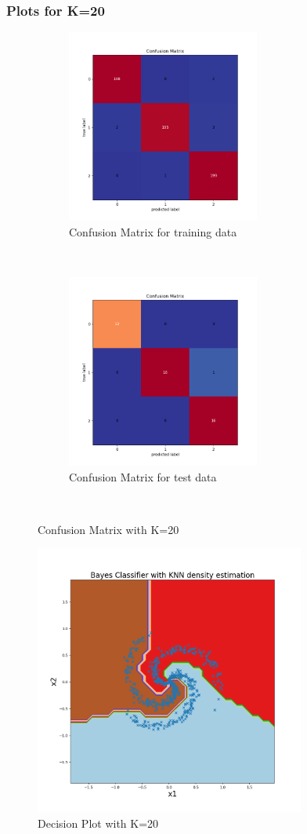 \subsubsection{Plots for K=20}

\begin{figure}[!ht]
    \centering
    \begin{subfigure}[t]{0.5\textwidth}
        \centering
        \includegraphics[height=2.5in]{Dataset_1b/K_20_cmatrix_train_data_bayes.png}
        \caption{Confusion Matrix for training data}
    \end{subfigure}%
    ~ 
    \begin{subfigure}[t]{0.5\textwidth}
        \centering
        \includegraphics[height=2.5in]{Dataset_1b/K_20_cmatrix_test_data_bayes.png}
        \caption{Confusion Matrix for test data}
    \end{subfigure}%
    ~
    \caption{Confusion Matrix with K=20}
    \label{fig:25}
\end{figure}
\begin{figure}[!ht]
    \centering
    \includegraphics[height=3.5in]{Dataset_1b/K_20_decision_plot_bayes.png}
    \caption{Decision Plot with K=20}
    \label{fig:26}
\end{figure}
